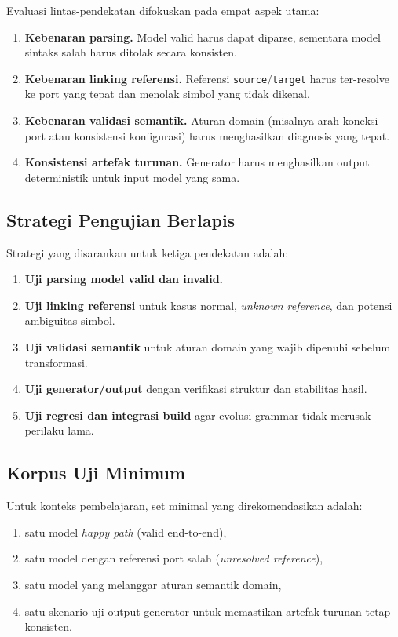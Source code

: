 Evaluasi lintas-pendekatan difokuskan pada empat aspek utama:
\begin{enumerate}
  \item \textbf{Kebenaran parsing.} Model valid harus dapat diparse, sementara model sintaks salah harus ditolak secara konsisten.
  \item \textbf{Kebenaran linking referensi.} Referensi \texttt{source}/\texttt{target} harus ter-resolve ke port yang tepat dan menolak simbol yang tidak dikenal.
  \item \textbf{Kebenaran validasi semantik.} Aturan domain (misalnya arah koneksi port atau konsistensi konfigurasi) harus menghasilkan diagnosis yang tepat.
  \item \textbf{Konsistensi artefak turunan.} Generator harus menghasilkan output deterministik untuk input model yang sama.
\end{enumerate}

\subsection{Strategi Pengujian Berlapis}

Strategi yang disarankan untuk ketiga pendekatan adalah:
\begin{enumerate}
  \item \textbf{Uji parsing model valid dan invalid.}
  \item \textbf{Uji linking referensi} untuk kasus normal, \textit{unknown reference}, dan potensi ambiguitas simbol.
  \item \textbf{Uji validasi semantik} untuk aturan domain yang wajib dipenuhi sebelum transformasi.
  \item \textbf{Uji generator/output} dengan verifikasi struktur dan stabilitas hasil.
  \item \textbf{Uji regresi dan integrasi build} agar evolusi grammar tidak merusak perilaku lama.
\end{enumerate}

\subsection{Korpus Uji Minimum}

Untuk konteks pembelajaran, set minimal yang direkomendasikan adalah:
\begin{enumerate}
  \item satu model \textit{happy path} (valid end-to-end),
  \item satu model dengan referensi port salah (\textit{unresolved reference}),
  \item satu model yang melanggar aturan semantik domain,
  \item satu skenario uji output generator untuk memastikan artefak turunan tetap konsisten.
\end{enumerate}

